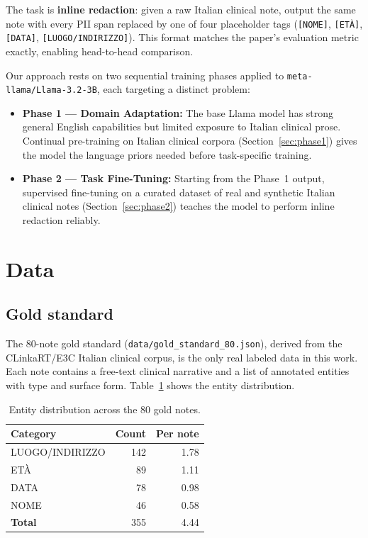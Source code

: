 \documentclass[11pt,a4paper]{article}
\begin{document}
The task is \textbf{inline redaction}: given a raw Italian clinical note, output the same note with every PII span replaced by one of four placeholder tags (\texttt{[NOME]}, \texttt{[ETÀ]}, \texttt{[DATA]}, \texttt{[LUOGO/INDIRIZZO]}). This format matches the paper's evaluation metric exactly, enabling head-to-head comparison.

Our approach rests on two sequential training phases applied to \texttt{meta-llama/Llama-3.2-3B}, each targeting a distinct problem:

\begin{itemize}[leftmargin=*,topsep=4pt,itemsep=2pt]
  \item \textbf{Phase 1 — Domain Adaptation:} The base Llama model has strong general English capabilities but limited exposure to Italian clinical prose. Continual pre-training on Italian clinical corpora (Section~\ref{sec:phase1}) gives the model the language priors needed before task-specific training.
  \item \textbf{Phase 2 — Task Fine-Tuning:} Starting from the Phase~1 output, supervised fine-tuning on a curated dataset of real and synthetic Italian clinical notes (Section~\ref{sec:phase2}) teaches the model to perform inline redaction reliably.
\end{itemize}

\section{Data}
\label{sec:data}

\subsection{Gold standard}

The 80-note gold standard (\texttt{data/gold\_standard\_80.json}), derived from the CLinkaRT/E3C Italian clinical corpus, is the only real labeled data in this work. Each note contains a free-text clinical narrative and a list of annotated entities with type and surface form. Table~\ref{tab:gold-dist} shows the entity distribution.

\begin{table}[h]
\centering
\caption{Entity distribution across the 80 gold notes.}
\label{tab:gold-dist}
\begin{tabular}{lrr}
\toprule
Category & Count & Per note \\
\midrule
LUOGO/INDIRIZZO & 142 & 1.78 \\
ETÀ             &  89 & 1.11 \\
DATA            &  78 & 0.98 \\
NOME            &  46 & 0.58 \\
\midrule
\textbf{Total}  & 355 & 4.44 \\
\bottomrule
\end{tabular}
\end{table}
\end{document}
